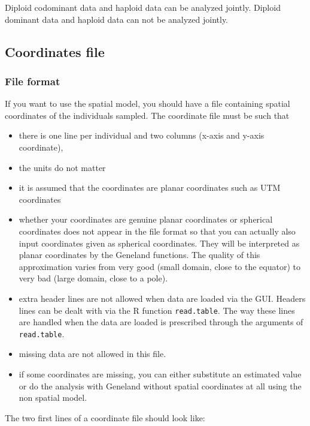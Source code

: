 \documentclass[a4paper,10pt]{article}
\begin{document}
Diploid codominant data and haploid  data can be analyzed jointly.
Diploid dominant data and haploid data can not be analyzed jointly.

\subsection{Coordinates file}


\subsubsection{File format}

If you want to use the spatial model, you should  have a file containing spatial coordinates of the individuals sampled.
The coordinate  file must be such that  
\begin{itemize}
\item there is one line per individual and two columns (x-axis and y-axis coordinate), 
\item the units do not matter
\item it is assumed that the coordinates are planar coordinates such as 
UTM coordinates 
\item whether your coordinates are genuine planar coordinates or spherical coordinates does not 
appear in the file  format so that you can actually 
also input coordinates given as spherical coordinates. 
They will be interpreted as planar coordinates by 
the {\sc Geneland} functions. The quality of this approximation varies from very good (small domain, close to the equator) 
to very bad (large domain, close to a pole). 
\item extra header lines are not allowed when data are loaded via the GUI. 
Headers lines can be dealt with via the R function \texttt{read.table}. 
 The way these lines are handled when the data are loaded is prescribed 
through the arguments of \texttt{read.table}. 
\item missing data are not allowed in this file. 
\item if some coordinates are missing, you can either substitute an estimated value 
or do the analysis with {\sc Geneland} without spatial coordinates at all using the non spatial model. 
\end{itemize}


The two first lines  of a coordinate file should look like:\\
\end{document}
